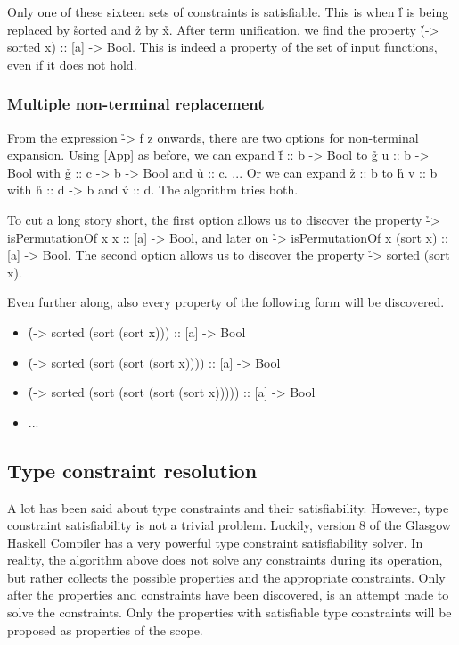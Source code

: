 \documentclass[a4paper, 11pt, onepage]{article}
\begin{document}
Only one of these sixteen sets of constraints is satisfiable.
This is when \h{f} is being replaced by \h{sorted} and \h{z} by \h{x}.
After term unification, we find the property \h{(\x -> sorted x) :: [a] -> Bool}.
This is indeed a property of the set of input functions, even if it does not hold.


\subsubsection{Multiple non-terminal replacement}

From the expression \h{\x -> f z} onwards, there are two options for non-terminal expansion.
Using [App] as before, we can expand \h{f :: b -> Bool} to \h{g u :: b -> Bool} with \h{g :: c -> b -> Bool} and \h{u :: c}.
... Or we can expand \h{z :: b} to \h{h v :: b} with \h{h :: d -> b} and \h{v :: d}.
The algorithm tries both.

To cut a long story short, the first option allows us to discover the property \h{\x -> isPermutationOf x x :: [a] -> Bool}, and later on \h{\x -> isPermutationOf x (sort x) :: [a] -> Bool}.
The second option allows us to discover the property \h{\x -> sorted (sort x)}.

Even further along, also every property of the following form will be discovered.

\begin{itemize}
  \item \h{(\x -> sorted (sort (sort x))) :: [a] -> Bool}
  \item \h{(\x -> sorted (sort (sort (sort x)))) :: [a] -> Bool}
  \item \h{(\x -> sorted (sort (sort (sort (sort x))))) :: [a] -> Bool}
  \item ...
\end{itemize}


\subsection{Type constraint resolution}

A lot has been said about type constraints and their satisfiability.
However, type constraint satisfiability is not a trivial problem.
Luckily, version 8 of the Glasgow Haskell Compiler \cite{GHC8} has a very powerful type constraint satisfiability solver\cite{Schrijvers2015}.
In reality, the algorithm above does not solve any constraints during its operation, but rather collects the possible properties and the appropriate constraints.
Only after the properties and constraints have been discovered, is an attempt made to solve the constraints.
Only the properties with satisfiable type constraints will be proposed as properties of the scope.
\end{document}
